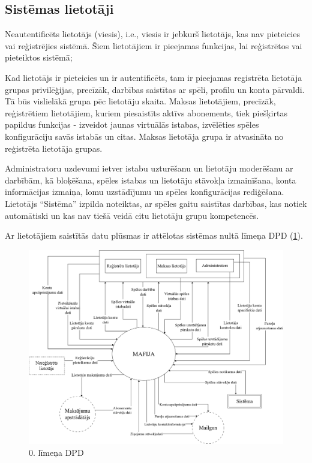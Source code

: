 \subsection{Sistēmas lietotāji}

Neautentificēts lietotājs (viesis), i.e., viesis ir jebkurš lietotājs, kas nav
pieteicies vai reģistrējies sistēmā. Šiem lietotājiem ir pieejamas funkcijas,
lai reģistrētos vai pieteiktos sistēmā;

Kad lietotājs ir pieteicies un ir autentificēts, tam ir pieejamas registrēta
lietotāja grupas privilēģijas, precīzāk, darbības saistītas ar spēli, profilu
un konta pārvaldi. Tā būs vislielākā grupa pēc lietotāju skaita. Maksas
lietotājiem, precīzāk, reģistrētiem lietotājiem, kuriem piesaistīts aktīvs
abonements, tiek piešķirtas papildus funkcijas - izveidot jaunas virtuālās
istabas, izvēlēties spēles konfigurāciju savās istabās un citas. Maksas
lietotāja grupa ir atvasināta no reģistrēta lietotāja grupas.

Administratoru uzdevumi ietver istabu uzturēšanu un  lietotāju moderēšanu ar
darbībām, kā bloķēšana, spēles istabas un lietotāju stāvokļa izmainīšana, konta
informācijas izmaiņa, lomu uzstādījumu un spēles konfigurācijas rediģēšana.
Lietotājs ``Sistēma'' izpilda noteiktas, ar spēles gaitu saistītas darbības, kas
notiek automātiski un kas nav tiešā veidā citu lietotāju grupu kompetencēs.

Ar lietotājiem saistītās datu plūsmas ir attēlotas sistēmas nultā līmeņa DPD
(\ref{fig:dpd-0}).


\begin{figure}[htbp]
	\centering
	\includegraphics[width=\linewidth]{./src/img/0tāLīmeņaDPD.png}
	\caption{0. līmeņa DPD}
	\label{fig:dpd-0}
\end{figure}
